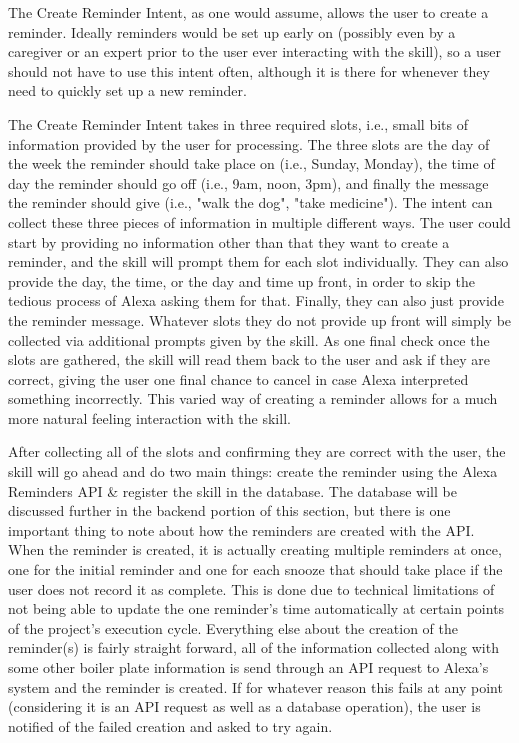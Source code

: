 \documentclass[11pt, oneside]{article}
\begin{document}
The Create Reminder Intent, as one would assume, allows the user to create a reminder. 
Ideally reminders would be set up early on (possibly even by a caregiver or an expert prior to the user ever interacting with the skill), so a user should not have to use this intent often, although it is there for whenever they need to quickly set up a new reminder. 

The Create Reminder Intent takes in three required slots, i.e., small bits of information provided by the user for processing. 
The three slots are the day of the week the reminder should take place on (i.e., Sunday, Monday), the time of day the reminder should go off (i.e., 9am, noon, 3pm), and finally the message the reminder should give (i.e., "walk the dog", "take medicine").
The intent can collect these three pieces of information in multiple different ways. 
The user could start by providing no information other than that they want to create a reminder, and the skill will prompt them for each slot individually. 
They can also provide the day, the time, or the day and time up front, in order to skip the tedious process of Alexa asking them for that. 
Finally, they can also just provide the reminder message. 
Whatever slots they do not provide up front will simply be collected via additional prompts given by the skill. 
As one final check once the slots are gathered, the skill will read them back to the user and ask if they are correct, giving the user one final chance to cancel in case Alexa interpreted something incorrectly. 
This varied way of creating a reminder allows for a much more natural feeling interaction with the skill. 

After collecting all of the slots and confirming they are correct with the user, the skill will go ahead and do two main things: create the reminder using the Alexa Reminders API \& register the skill in the database. 
The database will be discussed further in the backend portion of this section, but there is one important thing to note about how the reminders are created with the API. 
When the reminder is created, it is actually creating multiple reminders at once, one for the initial reminder and one for each snooze that should take place if the user does not record it as complete. 
This is done due to technical limitations of not being able to update the one reminder's time automatically at certain points of the project's execution cycle. 
Everything else about the creation of the reminder(s) is fairly straight forward, all of the information collected along with some other boiler plate information is send through an API request to Alexa's system and the reminder is created.
If for whatever reason this fails at any point (considering it is an API request as well as a database operation), the user is notified of the failed creation and asked to try again. 
\end{document}
